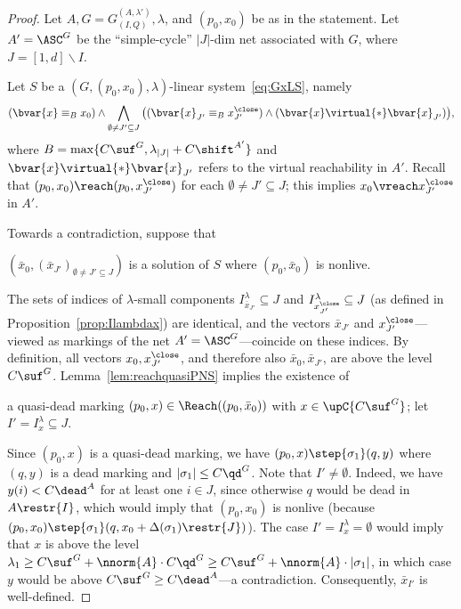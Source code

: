 \begin{proof}
Let $A,G=G_{(I,Q)}^{(A,\lambda')},\lambda$, and $(p_0,x_0)$ be as in
	the statement.
Let $A'=\ASC^G$ be the ``simple-cycle'' $|J|$-dim net associated with
	$G$, where $J=[1,d]\smallsetminus I$.

	Let $S$ be a $(G,(p_0,x_0),\lambda)$-linear
	system~\eqref{eq:GxLS}, namely
\begin{equation*}
	(\bvar{x}\equiv_B x_0)
	\land
	\bigwedge_{\emptyset\neq J'\subseteq
	J}\big((\bvar{x}_{J'}\equiv_B x^\close_{J'})\land
	(\bvar{x}\virtual{*}\bvar{x}_{J'})\big),
\end{equation*}
	where $B=\max\{C\suf^G,\lambda_{|J|}+C\shift^{A'}\}$
and
	$\bvar{x}\virtual{*}\bvar{x}_{J'}$ refers to the virtual
	reachability in $A'$. 
	Recall that $(p_0,x_0)\reach (p_0,x^\close_{J'})$ for each
	$\emptyset\neq J'\subseteq J$; this implies $x_0\vreach
	x^\close_{J'}$ in $A'$.

Towards a contradiction, suppose that
	\begin{center}
		$(\bar{x}_0,(\bar{x}_{J'})_{\emptyset\neq J'\subseteq
		J})$ is a solution of $S$
		where $(p_0,\bar{x}_0)$ is nonlive. 
	\end{center}
	The sets of indices of $\lambda$-small components 
	$I^{\lambda}_{\bar{x}_{J'}}\subseteq J$ and
	$I^{\lambda}_{x^\close_{J'}}\subseteq J$
	(as defined in	Proposition~\ref{prop:Ilambdax}) are
	identical,
	and the vectors $\bar{x}_{J'}$ and $x^\close_{J'}$---viewed as
	markings of the net $A'=\ASC^G$---coincide on
	these indices.
	By definition, all vectors $x_0,x^\close_{J'}$, and therefore also 
	$\bar{x}_0, \bar{x}_{J'}$, are above the level $C\suf^G$.
	Lemma~\ref{lem:reachquasiPNS} implies the existence of
	\begin{center}
	a quasi-dead
		marking $(p_0,x)\in\Reach((p_0,\bar{x}_0))$ with
		$x\in\upC{C\suf^G}$; let
		$I'=I^{\lambda}_{x}\subseteq J$. 
	\end{center}		
	Since $(p_0,x)$ is a quasi-dead marking, we have
	$(p_0,x)\step{\sigma_1}(q,y)$ where
	$(q,y)$ is a dead marking and
	$|\sigma_1|\leq C\qd^G$.  
Note that $I'\neq\emptyset$.
	Indeed, we have $y(i)< C\dead^A$
	for at least one $i\in J$, since otherwise $q$ would be dead
	in $A\restr{I}$, which would imply that $(p_0,x_0)$ is
	nonlive (because
	$(p_0,x_0)\step{\sigma_1}(q,x_0+\Delta(\sigma_1)\restr{J})$). 
	The case $I'=I^{\lambda}_{x}=\emptyset$ would imply
that $x$ is above the level $\lambda_1\geq C\suf^G+\nnorm{A}\cdot
	C\qd^G\geq C\suf^G+\nnorm{A}\cdot |\sigma_1|$, in which case $y$ would be above $C\suf^G\geq
	C\dead^A$---a contradiction. Consequently, 
	$\bar{x}_{I'}$ is well-defined.


\end{proof}
